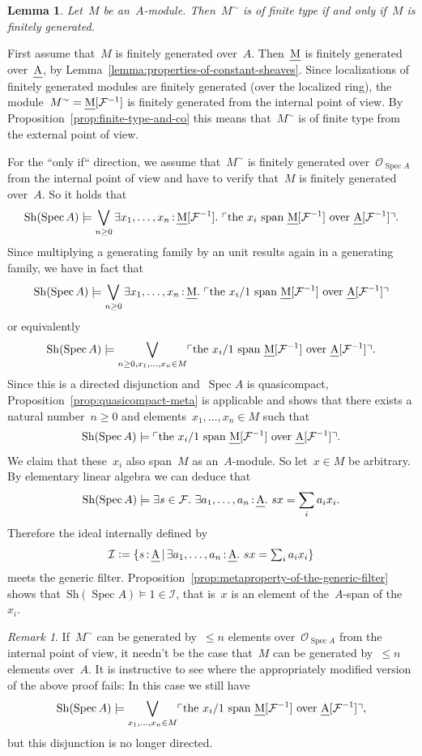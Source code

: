 \documentclass[10pt,reqno,a4paper]{amsbook}
\makeatletter
\theoremstyle{definition}
\theoremstyle{plain}
\newtheorem{lemma}[defn]{Lemma}
\theoremstyle{remark}
\newtheorem{rem}[defn]{Remark}
\newcommand{\F}{\mathcal{F}}
\renewcommand{\O}{\mathcal{O}}
\newcommand{\I}{\mathcal{I}}
\let\oldul\ul
\renewcommand{\ul}[1]{\text{\oldul{$#1$}}}
\newcommand{\Sh}{\mathrm{Sh}}
\DeclareMathOperator{\Spec}{Spec}
\newcommand{\?}{\,{:}\,}
\renewcommand{\_}{\mathpunct{.}\,}
\newcommand{\speak}[1]{\ulcorner\text{\textnormal{#1}}\urcorner}
\newcommand{\defeq}{\vcentcolon=}
\renewenvironment{proof}[1][\proofname]{\par
  \pushQED{\qed}%
  \normalfont \topsep6\p@\@plus6\p@\relax
  \trivlist
  \item[\hskip\labelsep
        \itshape
    #1\@addpunct{.}]\ignorespaces
}{%
  \popQED\endtrivlist\@endpefalse
}
\makeatother
\begin{document}
\begin{lemma}\label{lemma:finite-type-using-universal-filter}
Let~$M$ be an~$A$-module. Then~$M^\sim$ is of finite type if and
only if~$M$ is finitely generated.\end{lemma}
\begin{proof}First assume that~$M$ is finitely generated over~$A$.
Then~$\ul{M}$ is finitely generated over~$\ul{A}$, by
Lemma~\ref{lemma:properties-of-constant-sheaves}. Since localizations of
finitely generated modules are finitely generated (over the localized ring),
the module~$M^\sim = \ul{M}[\F^{-1}]$ is finitely generated from the internal
point of view. By Proposition~\ref{prop:finite-type-and-co} this means
that~$M^\sim$ is of finite type from the external point of view.

For the ``only if`` direction, we assume that~$M^\sim$ is finitely generated
over~$\O_{\Spec A}$ from the internal point of view and have to verify that~$M$
is finitely generated over~$A$. So it holds that
\[ \Sh(\Spec A) \models \bigvee_{n \geq 0}
  \exists x_1,\ldots,x_n\?\ul{M}[\F^{-1}]\_
  \speak{the $x_i$ span~$\ul{M}[\F^{-1}]$ over~$\ul{A}[\F^{-1}]$}. \]
Since multiplying a generating family by an unit results again in a generating
family, we have in fact that
\[ \Sh(\Spec A) \models \bigvee_{n \geq 0}
  \exists x_1,\ldots,x_n\?\ul{M}\_
  \speak{the $x_i/1$ span~$\ul{M}[\F^{-1}]$ over~$\ul{A}[\F^{-1}]$} \]
or equivalently
\[ \Sh(\Spec A) \models \bigvee_{n \geq 0, x_1,\ldots,x_n \in M}
  \speak{the $x_i/1$ span~$\ul{M}[\F^{-1}]$ over~$\ul{A}[\F^{-1}]$}. \]
Since this is a directed disjunction and~$\Spec A$ is quasicompact,
Proposition~\ref{prop:quasicompact-meta} is applicable and shows that there
exists a natural number~$n \geq 0$ and elements~$x_1,\ldots,x_n \in M$ such
that
\[ \Sh(\Spec A) \models \speak{the $x_i/1$ span~$\ul{M}[\F^{-1}]$
over~$\ul{A}[\F^{-1}]$}. \]
We claim that these~$x_i$ also span~$M$ as an~$A$-module. So let~$x \in M$ be
arbitrary. By elementary linear algebra we can deduce that
\[ \Sh(\Spec A) \models \exists s\in\F\_ \exists a_1,\ldots,a_n\?\ul{A}\_
  sx = \sum_i a_i x_i. \]
Therefore the ideal internally defined by
\[ \I \defeq \{ s\?\ul{A} \,|\, \exists a_1,\ldots,a_n\?\ul{A}\_
  sx = \textstyle\sum_i a_i x_i \} \]
meets the generic filter.
Proposition~\ref{prop:metaproperty-of-the-generic-filter} shows that~$\Sh(\Spec A)
\models 1 \in \I$, that is~$x$ is an element of the~$A$-span of the~$x_i$.
\end{proof}

\begin{rem}If~$M^\sim$ can be generated by~$\leq n$ elements over~$\O_{\Spec
A}$ from the internal point of view, it needn't be the case that~$M$ can be
generated by~$\leq n$ elements over~$A$. It is instructive to see where the
appropriately modified version of the above proof fails: In this case we still
have
\[ \Sh(\Spec A) \models \bigvee_{x_1,\ldots,x_n \in M}
  \speak{the $x_i/1$ span~$\ul{M}[\F^{-1}]$ over~$\ul{A}[\F^{-1}]$}, \]
but this disjunction is no longer directed.
\end{rem}
\end{document}
